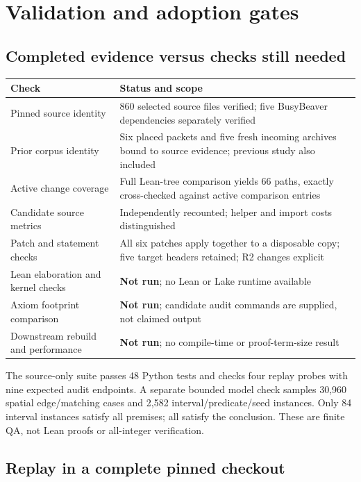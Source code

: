 \section{Validation and adoption gates}

\subsection{Completed evidence versus checks still needed}

\begin{tabularx}{\linewidth}{@{}L{2.15in}Y@{}}
\toprule
Check & Status and scope \\
\midrule
Pinned source identity & 860 selected source files verified; five BusyBeaver dependencies separately verified \\
Prior corpus identity & Six placed packets and five fresh incoming archives bound to source evidence; previous study also included \\
Active change coverage & Full Lean-tree comparison yields 66 paths, exactly cross-checked against active comparison entries \\
Candidate source metrics & Independently recounted; helper and import costs distinguished \\
Patch and statement checks & All six patches apply together to a disposable copy; five target headers retained; R2 changes explicit \\
Lean elaboration and kernel checks & \textbf{Not run}; no Lean or Lake runtime available \\
Axiom footprint comparison & \textbf{Not run}; candidate audit commands are supplied, not claimed output \\
Downstream rebuild and performance & \textbf{Not run}; no compile-time or proof-term-size result \\
\bottomrule
\end{tabularx}

The source-only suite passes 48 Python tests and checks four replay probes with nine expected audit endpoints. A separate bounded model check samples 30,960 spatial edge/matching cases and 2,582 interval/predicate/seed instances. Only 84 interval instances satisfy all premises; all satisfy the conclusion. These are finite QA, not Lean proofs or all-integer verification.

\subsection{Replay in a complete pinned checkout}

